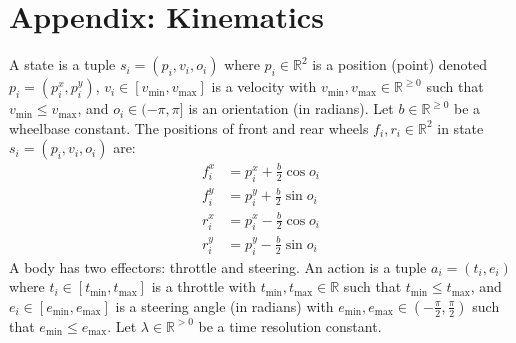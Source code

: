 \documentclass[10pt]{article}
\theoremstyle{plain}
\begin{document}
\section*{Appendix: Kinematics}
A state is a tuple $s_{i} = (p_{i}, v_{i}, o_{i})$ where
$p_{i} \in \mathbb{R}^{2}$ is a position (point) denoted $p_{i} = (p_{i}^{x}, p_{i}^{y})$,
$v_{i} \in [v_{\min}, v_{\max}]$ is a velocity with $v_{\min}, v_{\max} \in \mathbb{R}^{\ge 0}$ such that $v_{\min} \le v_{\max}$,
and $o_{i} \in (-\pi, \pi]$ is an orientation (in radians).
Let $b \in \mathbb{R}^{\ge 0}$ be a wheelbase constant.
The positions of front and rear wheels $f_{i}, r_{i} \in \mathbb{R}^{2}$ in state $s_{i} = (p_{i}, v_{i}, o_{i})$ are:
\begin{align}
    f_{i}^{x} & = p_{i}^{x} + \frac{b}{2} \cos{o_{i}} \label{equation:kinematics_first} \\
    f_{i}^{y} & = p_{i}^{y} + \frac{b}{2} \sin{o_{i}} \\
    r_{i}^{x} & = p_{i}^{x} - \frac{b}{2} \cos{o_{i}} \\
    r_{i}^{y} & = p_{i}^{y} - \frac{b}{2} \sin{o_{i}}
\end{align}
A body has two effectors: throttle and steering.
An action is a tuple $a_{i} = (t_{i}, e_{i})$ where
$t_{i} \in [t_{\min}, t_{\max}]$ is a throttle with $t_{\min}, t_{\max} \in \mathbb{R}$ such that $t_{\min} \le t_{\max}$,
and $e_{i} \in [e_{\min}, e_{\max}]$ is a steering angle (in radians) with $e_{\min}, e_{\max} \in (-\frac{\pi}{2}, \frac{\pi}{2})$ such that $e_{\min} \le e_{\max}$.
Let $\lambda \in \mathbb{R}^{> 0}$ be a time resolution constant.
\end{document}
